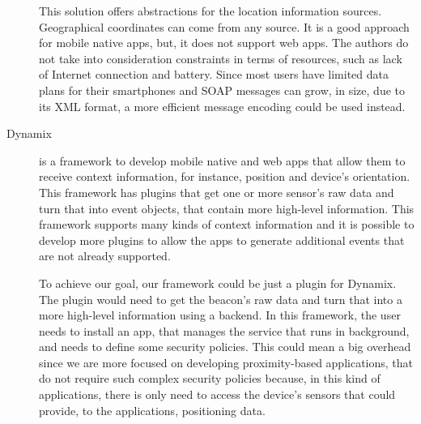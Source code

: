 \begin{description}
  This solution offers abstractions for the location
  information sources. Geographical coordinates can
  come from any source. It is a good approach for
  mobile native apps, but, it does not support web apps.
  The authors do not take into consideration
  constraints in terms of resources, such as
  lack of Internet connection and battery.
  Since most users have limited data plans for
  their smartphones and \gls{SOAP} messages can
  grow, in size, due to its \gls{XML} format,
  a more efficient message encoding could be used
  instead.
  \item[Dynamix\cite{Carlson2012}]
  is a framework to develop
  mobile native and web apps that allow them to receive
  context information, for instance, position and device's
  orientation. This framework has plugins that get
  one or more sensor's raw data and turn that into event
  objects, that contain more high-level information.
  This framework supports many kinds of context information
  and it is possible to develop more plugins to allow the
  apps to generate additional events that are not
  already supported.

  To achieve our goal, our framework could be just a
  plugin for Dynamix. The plugin would
  need to get the beacon's raw data and
  turn that into a more high-level information
  using a backend. In this framework,
  the user needs to install an app, that manages the service
  that runs in background, and needs to define some
  security policies. This could mean a big overhead since
  we are more focused on developing proximity-based applications, that do not require such complex security
  policies because, in this kind of applications, there is only need
  to access the device's sensors that could provide,
  to the applications, positioning data.
\end{description}

